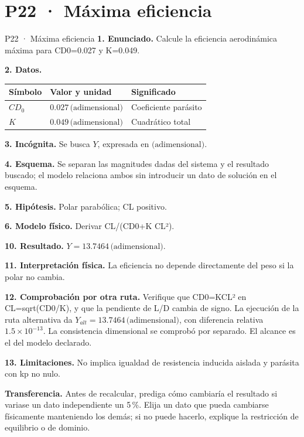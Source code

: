 \chapter*{P22 · Máxima eficiencia}
\begin{studiumworked}{P22 · Máxima eficiencia}
\textbf{1. Enunciado.} Calcule la eficiencia aerodinámica máxima para CD0=0.027 y K=0.049.

\textbf{2. Datos.}
\begin{longtable}{p{.16\linewidth}p{.35\linewidth}p{.38\linewidth}}\toprule Símbolo & Valor y unidad & Significado\\\midrule\endhead
$CD_{0}$ & $0.027\,\text{(adimensional)}$ & Coeficiente parásito\\
$K$ & $0.049\,\text{(adimensional)}$ & Cuadrático total\\
\bottomrule\end{longtable}
\textbf{3. Incógnita.} Se busca $Y$, expresada en $\text{(adimensional)}$.

\textbf{4. Esquema.} Se separan las magnitudes dadas del sistema y el resultado buscado; el modelo relaciona ambos sin introducir un dato de solución en el esquema.

\textbf{5. Hipótesis.} Polar parabólica; CL positivo.

\textbf{6. Modelo físico.} Derivar CL/(CD0+K CL²).


\textbf{10. Resultado.} $Y=13.7464\,\text{(adimensional)}$.

\textbf{11. Interpretación física.} La eficiencia no depende directamente del peso si la polar no cambia.

\textbf{12. Comprobación por otra ruta.} Verifique que CD0=KCL² en CL=sqrt(CD0/K), y que la pendiente de L/D cambia de signo. La ejecución de la ruta alternativa da $Y_{alt}=13.7464\,\text{(adimensional)}$, con diferencia relativa $1.5\times10^{-13}$. La consistencia dimensional se comprobó por separado. El alcance es el del modelo declarado.

\textbf{13. Limitaciones.} No implica igualdad de resistencia inducida aislada y parásita con kp no nulo.

\textbf{Transferencia.} Antes de recalcular, prediga cómo cambiaría el resultado si variase un dato independiente un 5\,\%. Elija un dato que pueda cambiarse físicamente manteniendo los demás; si no puede hacerlo, explique la restricción de equilibrio o de dominio.\par
\end{studiumworked}
